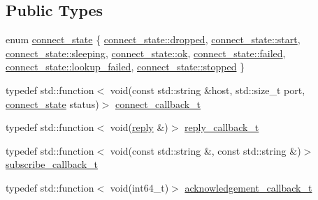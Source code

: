 \subsection*{Public Types}
\begin{DoxyCompactItemize}
\item 
enum \hyperlink{classcpp__redis_1_1subscriber_afc976757efd9d0ac4def6935546a2338}{connect\+\_\+state} \{ \newline
\hyperlink{classcpp__redis_1_1subscriber_afc976757efd9d0ac4def6935546a2338a41d368a58ee26891a6a586ddaaa604f8}{connect\+\_\+state\+::dropped}, 
\hyperlink{classcpp__redis_1_1subscriber_afc976757efd9d0ac4def6935546a2338aea2b2676c28c0db26d39331a336c6b92}{connect\+\_\+state\+::start}, 
\hyperlink{classcpp__redis_1_1subscriber_afc976757efd9d0ac4def6935546a2338ad98cb5df35fc9e0f42fb883d794ad12f}{connect\+\_\+state\+::sleeping}, 
\hyperlink{classcpp__redis_1_1subscriber_afc976757efd9d0ac4def6935546a2338a444bcb3a3fcf8389296c49467f27e1d6}{connect\+\_\+state\+::ok}, 
\newline
\hyperlink{classcpp__redis_1_1subscriber_afc976757efd9d0ac4def6935546a2338a26934eb377001f66e37289a5c93fe284}{connect\+\_\+state\+::failed}, 
\hyperlink{classcpp__redis_1_1subscriber_afc976757efd9d0ac4def6935546a2338a1c35224aee766403970dfaa34880ccde}{connect\+\_\+state\+::lookup\+\_\+failed}, 
\hyperlink{classcpp__redis_1_1subscriber_afc976757efd9d0ac4def6935546a2338af0a0bfe6bc7d2c58d2989034f83183e0}{connect\+\_\+state\+::stopped}
 \}
\item 
typedef std\+::function$<$ void(const std\+::string \&host, std\+::size\+\_\+t port, \hyperlink{classcpp__redis_1_1subscriber_afc976757efd9d0ac4def6935546a2338}{connect\+\_\+state} status)$>$ \hyperlink{classcpp__redis_1_1subscriber_a90f2f7d4c748c3c2e89d1e977fa6dce1}{connect\+\_\+callback\+\_\+t}
\item 
typedef std\+::function$<$ void(\hyperlink{classcpp__redis_1_1reply}{reply} \&)$>$ \hyperlink{classcpp__redis_1_1subscriber_a99d220cc662664e2399b709f61ac9581}{reply\+\_\+callback\+\_\+t}
\item 
typedef std\+::function$<$ void(const std\+::string \&, const std\+::string \&)$>$ \hyperlink{classcpp__redis_1_1subscriber_ac6ab8ebc526d784e4b79a39bbd73dca8}{subscribe\+\_\+callback\+\_\+t}
\item 
typedef std\+::function$<$ void(int64\+\_\+t)$>$ \hyperlink{classcpp__redis_1_1subscriber_a19ea39dfabeb19937a9ce4c8d21781b4}{acknowledgement\+\_\+callback\+\_\+t}
\end{DoxyCompactItemize}
